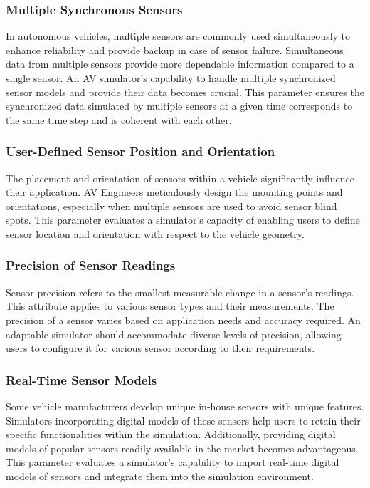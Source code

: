 \documentclass[12pt,twoside,a4paper,parskip]{scrbook} %
\begin{document}
\subsubsection{Multiple Synchronous Sensors}
In autonomous vehicles, multiple sensors are commonly used simultaneously to enhance reliability and provide backup in case of sensor failure. Simultaneous data from multiple sensors provide more dependable information compared to a single sensor. An AV simulator's capability to handle multiple synchronized sensor models and provide their data becomes crucial. This parameter ensures the synchronized data simulated by multiple sensors at a given time corresponds to the same time step and is coherent with each other.

\subsubsection{User-Defined Sensor Position and Orientation}
The placement and orientation of sensors within a vehicle significantly influence their application. AV Engineers meticulously design the mounting points and orientations, especially when multiple sensors are used to avoid sensor blind spots. This parameter evaluates a simulator's capacity of enabling users to define sensor location and orientation with respect to the vehicle geometry.

\subsubsection{Precision of Sensor Readings}
Sensor precision refers to the smallest measurable change in a sensor's readings. This attribute applies to various sensor types and their measurements. The precision of a sensor varies based on application needs and accuracy required. An adaptable simulator should accommodate diverse levels of precision, allowing users to configure it for various sensor according to their requirements.

\subsubsection{Real-Time Sensor Models}
Some vehicle manufacturers develop unique in-house sensors with unique features. Simulators incorporating digital models of these sensors help users to retain their specific functionalities within the simulation. Additionally, providing digital models of popular sensors readily available in the market becomes advantageous. This parameter evaluates a simulator's capability to import real-time digital models of sensors and integrate them into the simulation environment.
\end{document}
